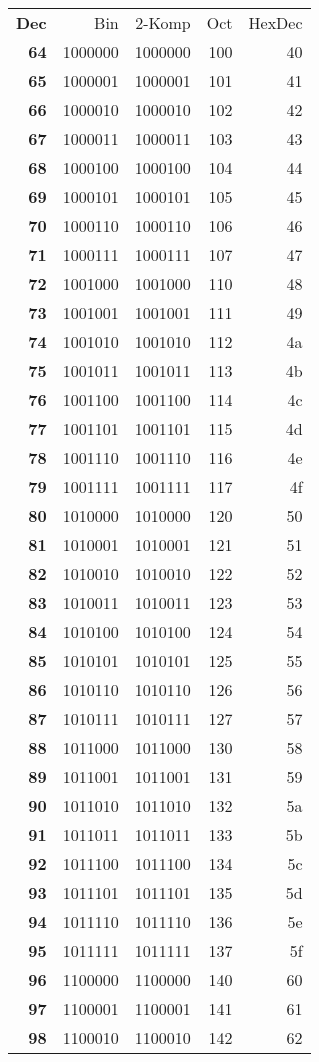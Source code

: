 \documentclass[a4paper]{article}
\begin{document}
\begin{tabular}{|>{\bfseries}r | r | r | r | r |}

Dec & Bin & 2-Komp & Oct & HexDec \\

64&1000000&1000000&100&40\\
65&1000001&1000001&101&41\\
66&1000010&1000010&102&42\\
67&1000011&1000011&103&43\\
68&1000100&1000100&104&44\\
69&1000101&1000101&105&45\\
70&1000110&1000110&106&46\\
71&1000111&1000111&107&47\\
72&1001000&1001000&110&48\\
73&1001001&1001001&111&49\\
74&1001010&1001010&112&4a\\
75&1001011&1001011&113&4b\\
76&1001100&1001100&114&4c\\
77&1001101&1001101&115&4d\\
78&1001110&1001110&116&4e\\
79&1001111&1001111&117&4f\\
80&1010000&1010000&120&50\\
81&1010001&1010001&121&51\\
82&1010010&1010010&122&52\\
83&1010011&1010011&123&53\\
84&1010100&1010100&124&54\\
85&1010101&1010101&125&55\\
86&1010110&1010110&126&56\\
87&1010111&1010111&127&57\\
88&1011000&1011000&130&58\\
89&1011001&1011001&131&59\\
90&1011010&1011010&132&5a\\
91&1011011&1011011&133&5b\\
92&1011100&1011100&134&5c\\
93&1011101&1011101&135&5d\\
94&1011110&1011110&136&5e\\
95&1011111&1011111&137&5f\\
96&1100000&1100000&140&60\\
97&1100001&1100001&141&61\\
98&1100010&1100010&142&62\\

\end{tabular}
\end{document}
